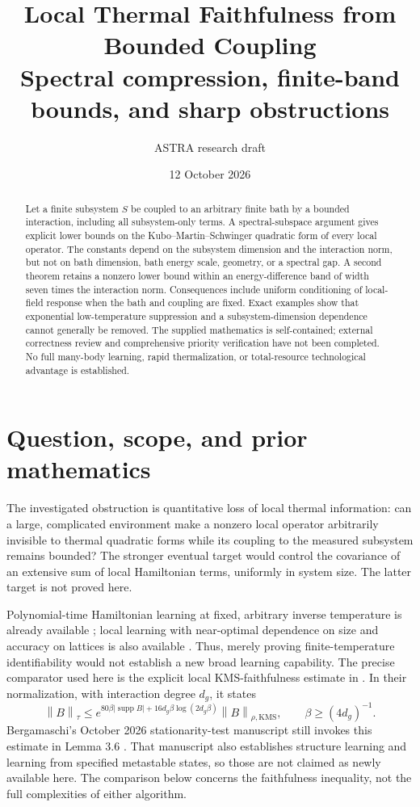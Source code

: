 \documentclass[11pt]{article}
\title{Local Thermal Faithfulness from Bounded Coupling\\[4pt]\large Spectral compression, finite-band bounds, and sharp obstructions}
\author{ASTRA research draft}
\date{12 October 2026}
\theoremstyle{remark}\newtheorem{remark}[theorem]{Remark}
\newcommand{\KMS}{\mathrm{KMS}}
\newcommand{\supp}{\operatorname{supp}}
\newcommand{\norm}[1]{\left\lVert #1\right\rVert}
\newcommand{\abs}[1]{\left\lvert #1\right\rvert}
\begin{document}
\maketitle
\begin{abstract}
Let a finite subsystem $S$ be coupled to an arbitrary finite bath by a bounded interaction, including all subsystem-only terms. A spectral-subspace argument gives explicit lower bounds on the Kubo--Martin--Schwinger quadratic form of every local operator. The constants depend on the subsystem dimension and the interaction norm, but not on bath dimension, bath energy scale, geometry, or a spectral gap. A second theorem retains a nonzero lower bound within an energy-difference band of width seven times the interaction norm. Consequences include uniform conditioning of local-field response when the bath and coupling are fixed. Exact examples show that exponential low-temperature suppression and a subsystem-dimension dependence cannot generally be removed. The supplied mathematics is self-contained; external correctness review and comprehensive priority verification have not been completed. No full many-body learning, rapid thermalization, or total-resource technological advantage is established.
\end{abstract}

\section{Question, scope, and prior mathematics}
The investigated obstruction is quantitative loss of local thermal information: can a large, complicated environment make a nonzero local operator arbitrarily invisible to thermal quadratic forms while its coupling to the measured subsystem remains bounded? The stronger eventual target would control the covariance of an extensive sum of local Hamiltonian terms, uniformly in system size. The latter target is not proved here.

Polynomial-time Hamiltonian learning at fixed, arbitrary inverse temperature is already available \cite{BLMT}; local learning with near-optimal dependence on size and accuracy on lattices is also available \cite{CAN}. Thus, merely proving finite-temperature identifiability would not establish a new broad learning capability. The precise comparator used here is the explicit local KMS-faithfulness estimate in \cite[Lemma III.6]{CAN}. In their normalization, with interaction degree $d_g$, it states
\begin{equation}\label{eq:prior}
 \norm{B}_{\tau}\leq
 e^{80\beta\abs{\supp B}+16d_g\beta\log(2d_g\beta)}\norm{B}_{\rho,\KMS},
 \qquad \beta\geq (4d_g)^{-1}.
\end{equation}
Bergamaschi's October 2026 stationarity-test manuscript still invokes this estimate in Lemma 3.6 \cite{Ber}. That manuscript also establishes structure learning and learning from specified metastable states, so those are not claimed as newly available here. The comparison below concerns the faithfulness inequality, not the full complexities of either algorithm.
\end{document}
